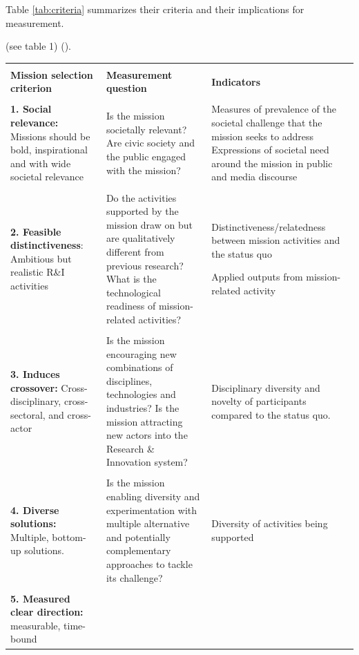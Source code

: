 \documentclass[11pt]{article}
\begin{document}
Table \ref{tab:criteria} summarizes their criteria and their implications for measurement.

(see table 1) (\citep{mazzucato_mission-oriented_2018}).

\begin{table}[!]
\centering
\begin{tabu} to \textwidth {  X[l]  X[l]  X[l]  }
 \\
 \\
 \textbf{Mission selection criterion} & \textbf{Measurement question} & \textbf{Indicators}
 \\
 \hline
 \\
 \textbf{1. Social relevance:} Missions should be bold, inspirational and with wide societal relevance & 
 Is the mission societally relevant?
 \newline
 \newline Are civic society and the public engaged with the mission?

 & Measures of prevalence of the societal challenge that the mission seeks to address
 \newline
 \newline Expressions of societal need around the mission in public and media discourse
 \\
 \\
 \textbf{2. Feasible distinctiveness}: Ambitious but realistic R\&I activities
 & Do the activities supported by the mission draw on but are qualitatively different from previous research?
 \newline
 \newline What is the technological readiness of mission-related activities?
 
 & Distinctiveness/relatedness between mission activities and the status quo
 
 \newline Applied outputs from mission-related activity
 
 \\
 \\
 \textbf{3. Induces crossover:} Cross-disciplinary, cross-sectoral, and cross-actor
 & Is the mission encouraging new combinations of disciplines, technologies and industries? 
 \newline
 \newline
 Is the mission attracting new actors into the Research \& Innovation system?
 
 & Disciplinary diversity and novelty of participants compared to the status quo.
 \\
 \\
 \textbf{4. Diverse solutions:} Multiple, bottom-up solutions.
 & Is the mission enabling diversity and experimentation with multiple alternative and potentially complementary approaches to tackle its challenge?
 & Diversity of activities being supported
 \\
 \\
 \textbf{5. Measured clear direction:} measurable, time-bound 
 

\end{tabu}
\end{table}
\end{document}
